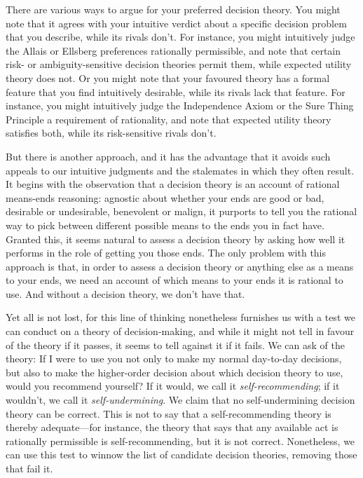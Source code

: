\documentclass[a4paper,final]{article}
\newenvironment{CCM rewritten}
{\begingroup\color{blue}} %
{\endgroup}              %
\begin{document}
There are various ways to argue for your preferred decision theory. You might note that it agrees with your intuitive verdict about a specific decision problem that you describe, while its rivals don't. For instance, you might intuitively judge the Allais or Ellsberg preferences rationally permissible, and note that certain risk- or ambiguity-sensitive decision theories permit them, while expected utility theory does not. Or you might note that your favoured theory has a formal feature that you find intuitively desirable, while its rivals lack that feature. For instance, you might intuitively judge the Independence Axiom or the Sure Thing Principle a requirement of rationality, and note that expected utility theory satisfies both, while its risk-sensitive rivals don't.
	
But there is another approach, and it has the advantage that it avoids such appeals to our intuitive judgments and the stalemates in which they often result. It begins with the observation that a decision theory is an account of rational means-ends reasoning: agnostic about whether your ends are good or bad, desirable or undesirable, benevolent or malign, it purports to tell you the rational way to pick between different possible means to the ends you in fact have. Granted this, it seems natural to assess a decision theory by asking how well it performs in the role of getting you those ends. The only problem with this approach is that, in order to assess a decision theory or anything else as a means to your ends, we need an account of which means to your ends it is rational to use. And without a decision theory, we don't have that. 
	
Yet all is not lost, for this line of thinking nonetheless furnishes us with a test we can conduct on a theory of decision-making, and while it might not tell in favour of the theory if it passes, it seems to tell against it if it fails. We can ask of the theory: If I were to use you not only to make my normal day-to-day decisions, but also to make the higher-order decision about which decision theory to use, would you recommend yourself? If it would, we call it \emph{self-recommending}; if it wouldn't, we call it \emph{self-undermining}. We claim that no self-undermining decision theory can be correct. This is not to say that a self-recommending theory is thereby adequate---for instance, the theory that says that any available act is rationally permissible is self-recommending, but it is not correct. Nonetheless, we can use this test to winnow the list of candidate decision theories, removing those that fail it.
\end{document}
